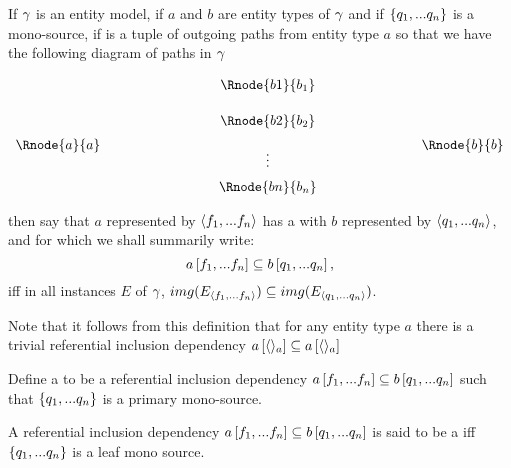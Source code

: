 \begin{definition}
If $\gamma$ is an entity model, 
if $a$ and $b$ are entity types of  $\gamma$ and  if $\left\{q_1,...q_n\right\}$
is a mono-source,
if \fntuple is a tuple of outgoing paths from entity type $a$  
so that we have the following diagram of paths in $\gamma$
\setlength{\arraycolsep}{.2cm}
\begin{center}
$
\begin{array}{cp{2cm}ccp{2cm}c}
             & &         & \Rnode{b1}{b_1} &&               \\ [0.5cm]
						 & &         & \Rnode{b2}{b_2} &&               \\ [0.2cm]
\Rnode{a}{a} & &         &                 &&  \Rnode{b}{b} \\ [-0.2cm]						
             & &         &    \vdots       &&               \\ [0.2cm]
             & &         & \Rnode{bn}{b_n} &&               \\ 
\end{array}
$
\end{center}
then say that $a$ represented by $\langle f_1,...f_n\rangle$ 
has a  with $b$ represented by $\langle q_1,...q_n\rangle$, and for which we shall summarily write:
$$
a\left[f_1,...f_n\right]\subseteq b\left[q_1,...q_n\right],
$$
iff in all instances $E$ of $\gamma$,
$img(E_{\langle f_1,...f_n\rangle}) \subseteq img(E_{\langle q_1,...q_n\rangle})$. 
\end{definition}

Note that it follows from this definition that for any entity type $a$ there is a trivial referential inclusion dependency $
a\left[\langle\rangle_a\right]\subseteq a\left[\langle\rangle_a\right]$

\begin{definition}
Define a  to be a
referential inclusion dependency $a\left[f_1,...f_n\right]\subseteq b\left[q_1,...q_n\right]$
such that $\left\{q_1,...q_n\right\}$ is a primary mono-source.
\end{definition}

\begin{definition} 
A referential inclusion dependency $a\left[f_1,...f_n\right]\subseteq b\left[q_1,...q_n\right]$ is said to be a  iff $\left\{q_1,...q_n\right\}$ is a leaf mono source. 
\end{definition}

